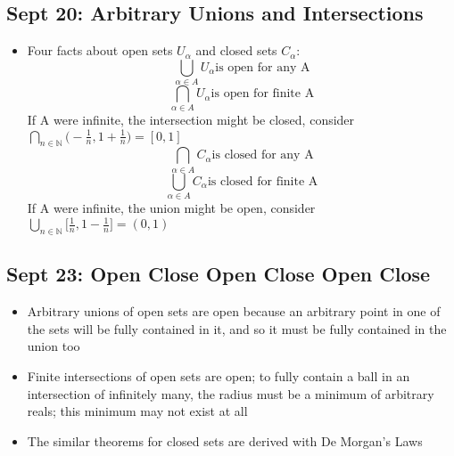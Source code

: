 \documentclass[10pt, oneside]{article}
\newcommand{\N}{\mathbb{N}}
\begin{document}
\subsection{Sept 20: Arbitrary Unions and Intersections}
\begin{itemize}
    \item Four facts about open sets $U_\alpha$ and closed sets $C_\alpha$:
    \[\bigcup_{\alpha \in A} U_\alpha \text{is open for any A}\]
    \[\bigcap_{\alpha \in A} U_\alpha \text{is open for finite A}\]
    If A were infinite, the intersection might be closed, consider $\displaystyle \bigcap_{n \in \N} \Big( -\frac{1}{n},1 + \frac{1}{n} \Big) = [0,1]$
    \[\bigcap_{\alpha \in A} C_\alpha \text{is closed for any A}\]
    \[\bigcup_{\alpha \in A} C_\alpha \text{is closed for finite A}\]
    If A were infinite, the union might be open, consider $\displaystyle \bigcup_{n \in \N} \Big[ \frac{1}{n},1 - \frac{1}{n} \Big] = (0,1)$
\end{itemize}

\subsection{Sept 23: Open Close Open Close Open Close}
\begin{itemize}
    \item Arbitrary unions of open sets are open because an arbitrary point in one of the sets will be fully contained in it, and so it must be fully contained in the union too
    \item Finite intersections of open sets are open; to fully contain a ball in an intersection of infinitely many, the radius must be a minimum of arbitrary reals; this minimum may not exist at all
    \item The similar theorems for closed sets are derived with De Morgan's Laws
\end{itemize}
\end{document}
